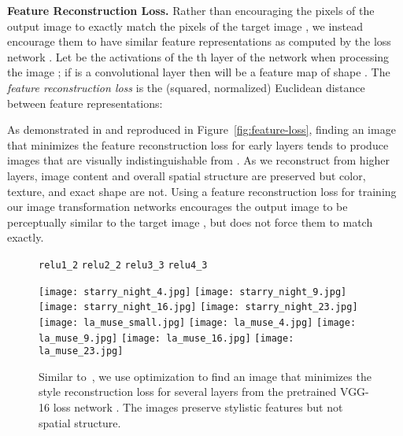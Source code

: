 \documentclass[runningheads]{llncs}
\begin{document}
\vspace{1mm}
\noindent\textbf{Feature Reconstruction Loss.}
Rather than encouraging the pixels of the output image  to exactly match
the pixels of the target image , we instead encourage them to have similar feature
representations as computed by the loss network . Let  be the activations
of the th layer of the network  when processing the image ; if  is a
convolutional layer then  will be a feature map of shape
. The \emph{feature reconstruction loss} is
the (squared, normalized) Euclidean distance between feature representations:

As demonstrated in \cite{mahendran15understanding} and reproduced in
Figure~\ref{fig:feature-loss}, finding an image  that minimizes the feature
reconstruction loss for early layers tends to produce images that are visually
indistinguishable from . As we reconstruct from higher layers, image content
and overall spatial structure are preserved but color, texture, and exact shape are not.
Using a feature reconstruction loss for training our image transformation networks encourages
the output image  to be perceptually similar to the target image , but does not
force them to match exactly.



\begin{figure}[t]
  \hspace{11mm} 
  \hspace{15mm} \verb|relu1_2|
  \hspace{10mm} \verb|relu2_2|
  \hspace{10mm} \verb|relu3_3|
  \hspace{10mm} \verb|relu4_3|
  \vspace{-2.5mm}
  \begin{center}
    \texttt{[image: starry\_night\_4.jpg]}
    \texttt{[image: starry\_night\_9.jpg]}
    \texttt{[image: starry\_night\_16.jpg]}
    \texttt{[image: starry\_night\_23.jpg]} \\
    \texttt{[image: la\_muse\_small.jpg]}
    \texttt{[image: la\_muse\_4.jpg]}
    \texttt{[image: la\_muse\_9.jpg]}
    \texttt{[image: la\_muse\_16.jpg]}
    \texttt{[image: la\_muse\_23.jpg]}
  \end{center}
  \vspace{-5mm}
  \caption{Similar to~\cite{gatys2015neural}, we use optimization to find an image 
    that minimizes the style reconstruction loss 
    for several layers  from the pretrained VGG-16 loss network . The images
     preserve stylistic features but not spatial structure.
  }
  \label{fig:style-loss}
\end{figure}
\end{document}
